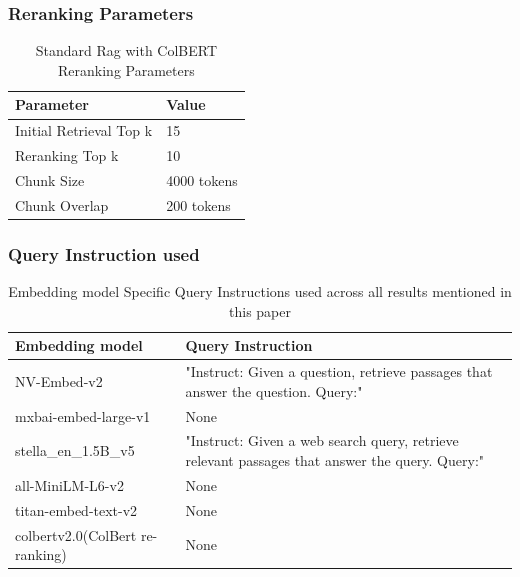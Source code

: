 \documentclass{scrartcl}
\begin{document}
\subsubsection{Reranking Parameters}

\begin{table}[H]
\centering
\begin{tabular}{|l|l|}
\hline
\textbf{Parameter} & \textbf{Value} \\
\hline
Initial Retrieval Top k & 15 \\
Reranking Top k & 10 \\
Chunk Size & 4000 tokens \\
Chunk Overlap & 200 tokens \\
\hline
\end{tabular}
\caption{Standard Rag with ColBERT Reranking Parameters}
\label{table:rerank_params}
\end{table}

\subsubsection{Query Instruction used}

\begin{table}[H]
\centering
\begin{tabular}{|l|p{10cm}|} %
\hline
\textbf{Embedding model} & \textbf{Query Instruction} \\
\hline
NV-Embed-v2 & "Instruct: Given a question, retrieve passages that answer the question. Query:" \\
mxbai-embed-large-v1 & None \\
stella\_en\_1.5B\_v5 & "Instruct: Given a web search query, retrieve relevant passages that answer the query. Query:" \\
all-MiniLM-L6-v2 & None \\
titan-embed-text-v2 & None \\
colbertv2.0(ColBert re-ranking) & None \\
\hline
\end{tabular}
\caption{Embedding model Specific Query Instructions used across all results mentioned in this paper}
\label{table:model_instructions}
\end{table}
\end{document}
